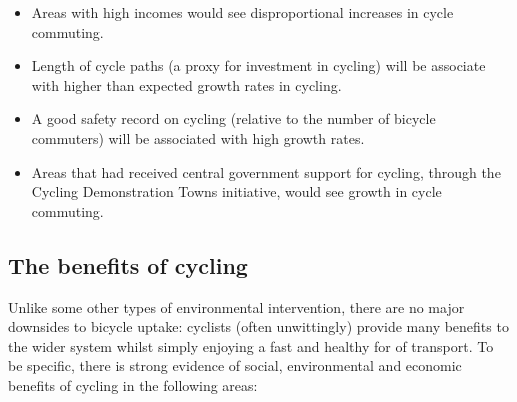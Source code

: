 \begin{itemize}
\itemsep1pt\parskip0pt
\item
  Areas with high incomes would see disproportional increases in cycle
  commuting.
\item
  Length of cycle paths (a proxy for investment in cycling) will be
  associate with higher than expected growth rates in cycling.
\item
  A good safety record on cycling (relative to the number of bicycle
  commuters) will be associated with high growth rates.
\item
  Areas that had received central government support for cycling,
  through the Cycling Demonstration Towns initiative, would see growth
  in cycle commuting.
\end{itemize}

\subsection{The benefits of cycling}\label{the-benefits-of-cycling}

Unlike some other types of environmental intervention, there are no
major downsides to bicycle uptake: cyclists (often unwittingly) provide
many benefits to the wider system whilst simply enjoying a fast and
healthy for of transport. To be specific, there is strong evidence of
social, environmental and economic benefits of cycling in the following
areas:

